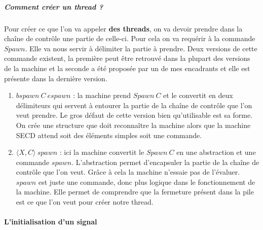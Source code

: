 \documentclass[10pt,a4paper]{article}
\begin{document}
					\subparagraph{Comment créer un thread ?}
					Pour créer ce que l'on va appeler \textbf{des threads}, on va devoir prendre dans la chaîne de contrôle une partie de celle-ci. Pour cela on va requérir à la commande $Spawn$. Elle va nous servir à délimiter la partie à prendre. Deux versions de cette commande existent, la première peut être retrouvé dans la plupart des versions de la machine et la seconde a été proposée par un de mes encadrants et elle est présente dans la dernière version.
					\smallbreak
					\begin{enumerate}
						\item $bspawn~C~espawn$ : la machine prend $Spawn~C$ et le convertit en deux délimiteurs qui servent à entourer la partie de la chaîne de contrôle que l'on veut prendre. Le gros défaut de cette version bien qu'utilisable est sa forme. On crée une structure que doit reconnaître la machine alors que la machine SECD attend soit des éléments simples soit une commande.
						\item $\langle X,C\rangle~spawn$ : ici la machine convertit le $Spawn~C$ en une abstraction et une commande $spawn$. L'abstraction permet d'encapsuler la partie de la chaîne de contrôle que l'on veut. Grâce à cela la machine n'essaie pas de l'évaluer. $spawn$ est juste une commande, donc plus logique dans le fonctionnement de la machine. Elle permet de comprendre que la fermeture présent dans la pile est ce que l'on veut pour créer notre thread. 
					\end{enumerate}
					\medbreak
						
						
						
				\paragraph{L'initialisation d'un signal}
					
\end{document}
